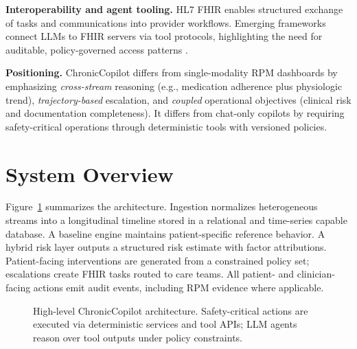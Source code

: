 \documentclass[conference]{IEEEtran}
\begin{document}
\textbf{Interoperability and agent tooling.} HL7 FHIR enables structured exchange of tasks and communications into provider workflows. Emerging frameworks connect LLMs to FHIR servers via tool protocols, highlighting the need for auditable, policy-governed access patterns \cite{mcpfhir}.

\textbf{Positioning.} ChronicCopilot differs from single-modality RPM dashboards by emphasizing \emph{cross-stream} reasoning (e.g., medication adherence plus physiologic trend), \emph{trajectory-based} escalation, and \emph{coupled} operational objectives (clinical risk and documentation completeness). It differs from chat-only copilots by requiring safety-critical operations through deterministic tools with versioned policies.

\section{System Overview}
Figure~\ref{fig:arch} summarizes the architecture. Ingestion normalizes heterogeneous streams into a longitudinal timeline stored in a relational and time-series capable database. A baseline engine maintains patient-specific reference behavior. A hybrid risk layer outputs a structured risk estimate with factor attributions. Patient-facing interventions are generated from a constrained policy set; escalations create FHIR tasks routed to care teams. All patient- and clinician-facing actions emit audit events, including RPM evidence where applicable.

\begin{figure}[t]
\centering
{}
\caption{High-level ChronicCopilot architecture. Safety-critical actions are executed via deterministic services and tool APIs; LLM agents reason over tool outputs under policy constraints.}
\label{fig:arch}
\end{figure}
\end{document}

